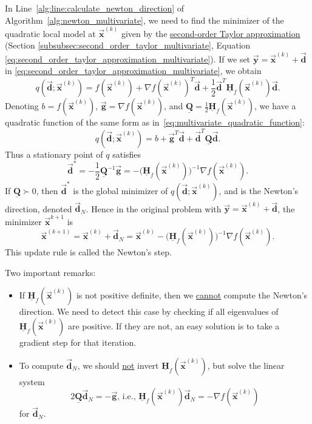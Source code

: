 \documentclass[9pt, headings=standardclasses, parskip=half]{scrartcl}
\renewcommand{\emph}[1]{\textcolor{mypurple}{#1}}
\newcommand{\matr}[1]{\underline{\boldsymbol{#1}}}
\newcommand{\vect}[1]{\vec{\boldsymbol{#1}}}
\begin{document}
In Line~\ref{alg:line:calculate_newton_direction} of Algorithm~\ref{alg:newton_multivariate}, we need to find the minimizer of the quadratic local model at \(\vect{x}^{(k)}\) given by the \hyperref[eq:second_order_taylor_approximation_multivariate]{second-order Taylor approximation} (Section \ref{subsubsec:second_order_taylor_multivariate}, Equation \ref{eq:second_order_taylor_approximation_multivariate}).
If we set \(\vect{y} = \vect{x}^{(k)} + \vect{d}\) in \eqref{eq:second_order_taylor_approximation_multivariate}, we obtain
\[
q(\vect{d};\vect{x}^{(k)}) = f(\vect{x}^{(k)}) + \nabla f(\vect{x}^{(k)})^{T}\vect{d} + \frac{1}{2}\vect{d}^{T}\matr{H}_{f}(\vect{x}^{(k)})\vect{d} \text{.}
\]
Denoting \(b = f(\vect{x}^{(k)})\), \(\vect{g} = \nabla f(\vect{x}^{(k)})\), and \(\matr{Q} = \frac{1}{2}\matr{H}_{f}(\vect{x}^{(k)})\), we have a quadratic function of the same form as in~\eqref{eq:multivariate_quadratic_function}:
\[
q(\vect{d};\vect{x}^{(k)}) = b + \vect{g}^{T}\vect{d} + \vect{d}^{T}\matr{Q}\vect{d} \text{.}
\]
Thus a stationary point of \(q\) satisfies
\[
\vect{d}^{*} = -\frac{1}{2}\matr{Q}^{-1}\vect{g} = -\big(\matr{H}_{f}(\vect{x}^{(k)})\big)^{-1} \nabla f(\vect{x}^{(k)}) \text{.}
\]
If \(\matr{Q} \succ 0\), then \(\vect{d}^{*}\) is the global minimizer of \(q(\vect{d};\vect{x}^{(k)})\), and is the \emph{Newton's direction}, denoted \(\vect{d}_{N}\).
Hence in the original problem with \(\vect{y} = \vect{x}^{(k)} + \vect{d}\), the minimizer \(\vect{x}^{k+1}\) is
\[
\vect{x}^{(k+1)} = \vect{x}^{(k)} + \vect{d}_{N} = \vect{x}^{(k)} - \big(\matr{H}_{f}(\vect{x}^{(k)})\big)^{-1} \nabla f(\vect{x}^{(k)}) \text{.}
\]
This update rule is called the \emph{Newton's step}.
\begin{caution} Two important remarks:
\begin{itemize}
\item If \(\matr{H}_{f}(\vect{x}^{(k)})\) is not positive definite, then we \underline{cannot} compute the Newton's direction.
We need to detect this case by checking if all eigenvalues of \(\matr{H}_{f}(\vect{x}^{(k)})\) are positive.
If they are not, an easy solution is to take a gradient step for that iteration.
\item To compute \(\vect{d}_{N}\), we should \underline{not} invert \(\matr{H}_{f}(\vect{x}^{(k)})\), but solve the linear system 
\[
2\matr{Q}\vect{d}_{N} = -\vect{g} \text{, i.e., }\matr{H}_{f}(\vect{x}^{(k)})\vect{d}_{N} = -\nabla f(\vect{x}^{(k)})
\]
for \(\vect{d}_{N}\).
\end{itemize}
\end{caution}
\end{document}
